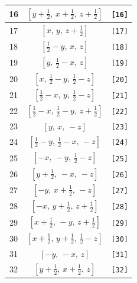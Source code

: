 \documentclass[fleqn,8pt]{jsarticle}
\begin{document}
\begin{longtable}{ccc}
16 & $\left[ y + \frac{1}{2},\, x + \frac{1}{2},\, z + \frac{1}{2} \right]$ & {\tt [16]} \\ \hline
17 & $\left[ x,\, y,\, z + \frac{1}{2} \right]$ & {\tt [17]} \\ \hline
18 & $\left[ \frac{1}{2} - y,\, x,\, z \right]$ & {\tt [18]} \\ \hline
19 & $\left[ y,\, \frac{1}{2} - x,\, z \right]$ & {\tt [19]} \\ \hline
20 & $\left[ x,\, \frac{1}{2} - y,\, \frac{1}{2} - z \right]$ & {\tt [20]} \\ \hline
21 & $\left[ \frac{1}{2} - x,\, y,\, \frac{1}{2} - z \right]$ & {\tt [21]} \\ \hline
22 & $\left[ \frac{1}{2} - x,\, \frac{1}{2} - y,\, z + \frac{1}{2} \right]$ & {\tt [22]} \\ \hline
23 & $\left[ y,\, x,\, - z \right]$ & {\tt [23]} \\ \hline
24 & $\left[ \frac{1}{2} - y,\, \frac{1}{2} - x,\, - z \right]$ & {\tt [24]} \\ \hline
25 & $\left[ - x,\, - y,\, \frac{1}{2} - z \right]$ & {\tt [25]} \\ \hline
26 & $\left[ y + \frac{1}{2},\, - x,\, - z \right]$ & {\tt [26]} \\ \hline
27 & $\left[ - y,\, x + \frac{1}{2},\, - z \right]$ & {\tt [27]} \\ \hline
28 & $\left[ - x,\, y + \frac{1}{2},\, z + \frac{1}{2} \right]$ & {\tt [28]} \\ \hline
29 & $\left[ x + \frac{1}{2},\, - y,\, z + \frac{1}{2} \right]$ & {\tt [29]} \\ \hline
30 & $\left[ x + \frac{1}{2},\, y + \frac{1}{2},\, \frac{1}{2} - z \right]$ & {\tt [30]} \\ \hline
31 & $\left[ - y,\, - x,\, z \right]$ & {\tt [31]} \\ \hline
32 & $\left[ y + \frac{1}{2},\, x + \frac{1}{2},\, z \right]$ & {\tt [32]} \\
\end{longtable}
\end{document}
